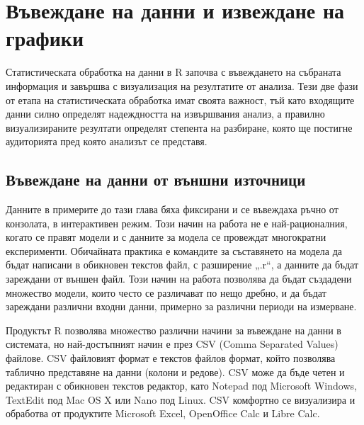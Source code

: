 ﻿\newpage
\chapter{Въвеждане на данни и извеждане на графики}
\label{chapter04}

Статистическата обработка на данни в R започва с въвеждането на събраната информация и завършва с визуализация на резултатите от анализа. Тези две фази от етапа на статистическата обработка имат своята важност, тъй като входящите данни силно определят надеждността на извършвания анализ, а правилно визуализираните резултати определят степента на разбиране, която ще постигне аудиторията пред която анализът се представя. 

\section{Въвеждане на данни от външни източници}

Данните в примерите до тази глава бяха фиксирани и се въвеждаха ръчно от конзолата, в интерактивен режим. Този начин на работа не е най-рационалния, когато се правят модели и с данните за модела се провеждат многократни експерименти. Обичайната практика е командите за съставянето на модела да бъдат написани в обикновен текстов файл, с разширение „.r“, а данните да бъдат зареждани от външен файл. Този начин на работа позволява да бъдат създадени множество модели, които често се различават по нещо дребно, и да бъдат зареждани различни входни данни, примерно за различни периоди на измерване. 

Продуктът R позволява множество различни начини за въвеждане на данни в системата, но най-достъпният начин е през CSV (Comma Separated Values) файлове. CSV файловият формат е текстов файлов формат, който позволява таблично представяне на данни (колони и редове). CSV може да бъде четен и редактиран с обикновен текстов редактор, като Notepad под Microsoft Windows, TextEdit под Mac OS X или Nano под Linux. CSV комфортно се визуализира и обработва от продуктите Microsoft Excel, OpenOffice Calc и Libre Calc. 

